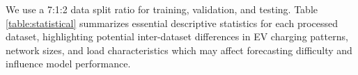 \documentclass[lettersize,journal]{IEEEtran}
\begin{document}
We use a 7:1:2 data split ratio for training, validation, and testing.
Table \ref{table:statistical} summarizes essential descriptive statistics for each processed dataset, highlighting potential inter-dataset differences in EV charging patterns, network sizes, and load characteristics which may affect forecasting difficulty and influence model performance. 

\begin{table}[t!]
	\centering
	\caption{The statistics of charging load datasets.}
    \vspace{-8pt}
        \vspace{-18pt}
        \label{table:statistical}%
\end{table}%
\end{document}

